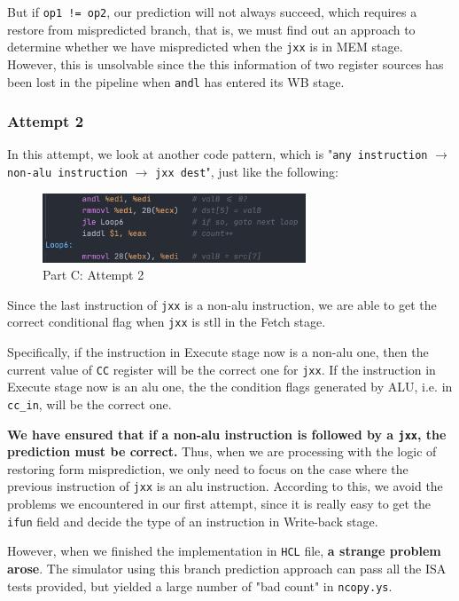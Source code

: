 \documentclass[12pt,a4paper]{article}
\begin{document}
But if \texttt{op1 != op2}, our prediction will not always succeed, which requires a restore from mispredicted branch, that is, we must find out an approach to determine whether we have mispredicted when the \texttt{jxx} is in MEM stage. However, this is unsolvable since the this information of two register sources has been lost in the pipeline when \texttt{andl} has entered its WB stage.
\subsubsection{Attempt 2}
In this attempt, we look at another code pattern, which is "\texttt{any instruction} $\rightarrow$ \texttt{non-alu instruction} $\rightarrow$ \texttt{jxx dest}", just like the following:
\begin{figure}[H] %
        \centering %
        \includegraphics[width=0.7\textwidth]{partC-attempt2.png} %
        \caption{Part C: Attempt 2} %
        \label{Fig.partC-attempt2} %
\end{figure}
Since the last instruction of \texttt{jxx} is a non-alu instruction, we are able to get the correct conditional flag when \texttt{jxx} is stll in the Fetch stage. 

Specifically, if the instruction in Execute stage now is a non-alu one, then the current value of \texttt{CC} register will be the correct one for \texttt{jxx}. If the instruction in Execute stage now is an alu one, the the condition flags generated by ALU, i.e. in \texttt{cc\_in}, will be the correct one. 

\textbf{We have ensured that if a non-alu instruction is followed by a \texttt{jxx}, the prediction must be correct.} Thus, when we are processing with the logic of restoring form misprediction, we only need to focus on the case where the previous instruction of \texttt{jxx} is an alu instruction. According to this, we avoid the problems we encountered in our first attempt, since it is really easy to get the \texttt{ifun} field and decide the type of an instruction in Write-back stage.

However, when we finished the implementation in \texttt{HCL} file, \textbf{a strange problem arose}. The simulator using this branch prediction approach can pass all the ISA tests provided, but yielded a large number of "bad count" in \texttt{ncopy.ys}. 
\end{document}
